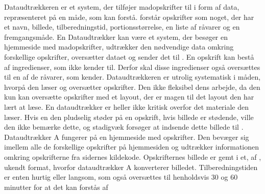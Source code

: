 {Dataudtrækkeren er et system, der tilføjer madopskrifter til \Foodl{} i form af data, repræsenteret på en måde, som \Foodl{} kan forstå. \Foodl{} forstår opskrifter som noget, der har et navn, billede, tilberedningstid, portionsstørrelse, en liste af råvarer og en fremgangsmåde. En Dataudtrækker kan \fx være et system, der besøger en hjemmeside med madopskrifter, udtrækker den nødvendige data omkring forskellige opskrifter, oversætter dataet og sender det til \Foodl{}. En opskrift kan bestå af ingredienser, som \Foodl{} ikke kender til. Derfor skal disse ingredienser også oversættes til en af de råvarer, som \Foodl{} kender.}
{Dataudtrækkeren er utrolig systematisk i måden, hvorpå den læser og oversætter opskrifter. Den ikke fleksibel dens arbejde, da den kun kan oversætte opskrifter med et layout, der er magen til det layout den har lært at læse. En dataudtrækker er heller ikke kritisk overfor det materiale den læser. Hvis en den pludselig støder på en opskrift, hvis billede er stødende, ville den ikke bemærke dette, og stadigvæk forsøger at indsende dette billede til \Foodl{}.}
{Dataudtrækker A fungerer på en hjemmeside med opskrifter. Den bevæger sig imellem alle de forskellige opskrifter på hjemmesiden og udtrækker informationen omkring opskrifterne fra sidernes kildekode. Opskrifternes billede er gemt i et, af \Foodl, ukendt format, hvorfor dataudtrækker A konverterer billedet. Tilberedningstiden er enten hurtig eller langsom, som også oversættes til henholdsvis 30 og 60 minutter for at det kan forstås af \Foodl{}}